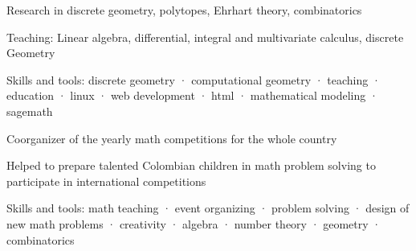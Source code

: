 \documentclass[]{plushcv}
\begin{document}
\begin{minipage}[t]{0.70\textwidth}
\sectionsep
{}
\begin{tightemize}
  \sectionsep
\item Research in discrete geometry, polytopes, Ehrhart theory, combinatorics
\item Teaching: Linear algebra, differential, integral and multivariate calculus, discrete Geometry
\item Skills and tools: discrete geometry · computational geometry · teaching · education  · linux · web development  · html · mathematical modeling · sagemath%
\end{tightemize}
\sectionsep

\begin{tightemize}
  \sectionsep
\item Coorganizer of the yearly math competitions for the whole country
\item Helped to prepare talented Colombian children in math problem solving to participate in international competitions
  
\item Skills and tools: math teaching  · event organizing  · problem solving  · design of new math problems · creativity · algebra  · number theory  · geometry  · combinatorics
\end{tightemize}







\end{minipage}
\end{document}
